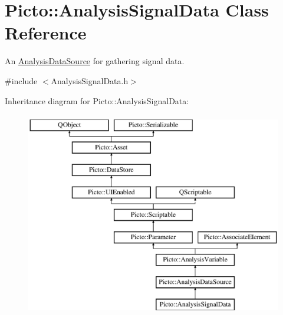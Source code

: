\hypertarget{class_picto_1_1_analysis_signal_data}{\section{Picto\-:\-:Analysis\-Signal\-Data Class Reference}
\label{class_picto_1_1_analysis_signal_data}
}


An \hyperlink{class_picto_1_1_analysis_data_source}{Analysis\-Data\-Source} for gathering signal data.  




{\ttfamily \#include $<$Analysis\-Signal\-Data.\-h$>$}

Inheritance diagram for Picto\-:\-:Analysis\-Signal\-Data\-:\begin{figure}[H]
\begin{center}
\leavevmode
\includegraphics[height=9.000000cm]{class_picto_1_1_analysis_signal_data}
\end{center}
\end{figure}
